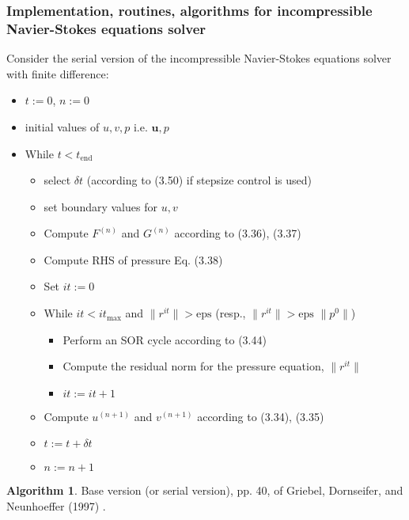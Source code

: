 \documentclass[10pt]{amsart}
\begin{document}
\begin{multicols*}{2}
\subsubsection{Implementation, routines, algorithms for incompressible Navier-Stokes equations solver}

Consider the serial version of the incompressible Navier-Stokes equations solver with finite difference:
\begin{itemize}
  \item $t:=0$, $n:= 0$ 
  \item initial values of $u,v, p$ i.e. $\mathbf{u},p$
  \item While $t<t_{\text{end}}$ \begin{itemize}
  \item select $\delta t$ (according to (3.50) if stepsize control is used)
  \item set boundary values for $u,v$
  \item Compute $F^{(n)}$ and $G^{(n)}$ according to (3.36), (3.37)
  \item Compute RHS of pressure Eq. (3.38)
  \item Set $it := 0$ 
  \item While $it < it_{\text{max}}$ and $\| r^{it} \| > \text{eps} $ (resp., $\|r^{it} \| > \text{eps } \| p^0 \|$) \begin{itemize}
    \item Perform an SOR cycle according to (3.44) 
    \item Compute the residual norm for the pressure equation, $\| r^{it} \|$
      \item $it:= it +1$
  \end{itemize}
 \item   Compute $u^{(n+1)}$ and $v^{(n+1)}$ according to (3.34), (3.35)
 \item $t:= t+ \delta t$ 
\item $n := n+1$
  \end{itemize}
\end{itemize}
\textbf{Algorithm 1}. Base version (or serial version), pp. 40, of Griebel, Dornseifer, and Neunhoeffer (1997) \cite{GDN1997}.


\end{multicols*}
\end{document}
